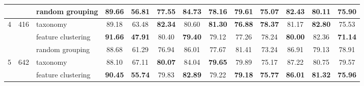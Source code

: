 \documentclass[final]{cvpr}
\begin{document}
\begin{table*}[t]
{\begin{tabular}{c|c|l|cc|cc|cc|cc|cc}
                                &                                                                                        & random grouping                                                                                             & 89.66                & 56.81                 & 77.55                & 84.73                 & 78.16                & 79.61                 & 75.07                & 82.43                 & 80.11                & 75.90                \\ \midrule
\multirow{3}{*}{4}              & \multirow{3}{*}{416}                                                                   & taxonomy                                                                                                    & 89.18                & 63.48                 & \textbf{82.34}       & 80.60                 & \textbf{81.30}       & \textbf{76.88}        & \textbf{78.37}       & 81.17                 & \textbf{82.80}       & 75.53                \\
                                &                                                                                        & feature clustering                                                                                          & \textbf{91.66}       & \textbf{47.91}        & 80.40                & \textbf{79.40}        & 79.12                & 77.26                 & 78.24                & \textbf{80.00}        & 82.36                & \textbf{71.14}       \\
                                &                                                                                        & random grouping                                                                                             & 88.68                & 61.29                 & 76.94                & 86.01                 & 77.67                & 81.41                 & 73.24                & 86.91                 & 79.13                & 78.91                \\ \midrule
\multirow{3}{*}{5}              & \multirow{3}{*}{642}                                                                   & taxonomy                                                                                                    & 88.10                & 67.11                 & \textbf{80.07}       & 84.04                 & \textbf{79.65}       & 79.89                 & 75.17                & 87.22                 & 80.75                & 79.57                \\
                                &                                                                                        & feature clustering                                                                                          & \textbf{90.45}       & \textbf{55.74}        & 79.83                & \textbf{82.89}        & 79.22                & \textbf{79.18}        & \textbf{75.77}       & \textbf{86.01}        & \textbf{81.32}       & \textbf{75.96}       \\

\end{tabular}}
\end{table*}
\end{document}
